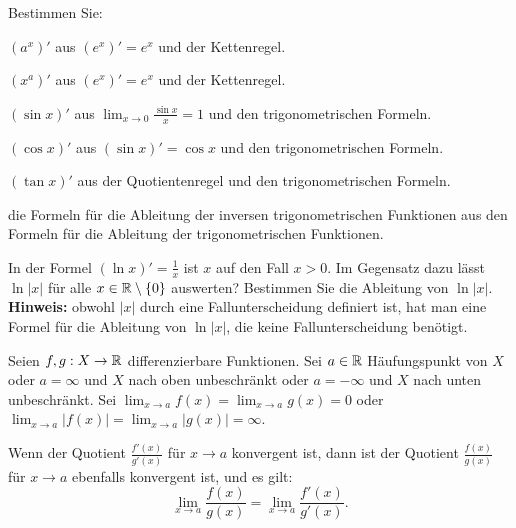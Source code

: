 	\begin{aufg} 
		Bestimmen Sie: 
		\begin{enuma}
			\item $(a^x)'$ aus $(e^x)' = e^x$ und der Kettenregel. 
			\item $(x^a)'$ aus $(e^x)' = e^x$ und der Kettenregel. 
			\item $(\sin x)'$ aus $\lim_{x \to 0} \frac{\sin x}{x} = 1$ und den trigonometrischen Formeln. 
			\item $(\cos x)'$ aus $(\sin x)' = \cos x$ und den trigonometrischen Formeln. 
			\item $(\tan x)'$ aus der Quotientenregel und den trigonometrischen Formeln.
			\item die Formeln für die Ableitung der inversen trigonometrischen Funktionen aus den Formeln für die Ableitung der trigonometrischen Funktionen. 
		\end{enuma} 
	\end{aufg} 

\begin{aufg} 
	In der Formel $(\ln x)' =\frac{1}{x}$ ist $x$ auf den Fall $x>0$. Im Gegensatz dazu lässt $\ln |x|$ für alle $x \in \mathbb{R} \setminus \{0\}$ auswerten? Bestimmen Sie die Ableitung von $\ln |x|$. 
	 \textbf{Hinweis:} obwohl $|x|$ durch eine Fallunterscheidung definiert ist, hat man eine Formel für die Ableitung von $\ln |x|$, die keine Fallunterscheidung benötigt. 
\end{aufg} 

\begin{thm}
	Seien $f, g : X \to \mathbb{R}$ differenzierbare Funktionen. Sei $a \in \mathbb{R}$ Häufungspunkt von $X$ oder $a=\infty$ und $X$ nach oben unbeschränkt oder $a = -\infty$ und $X$ nach unten unbeschränkt. Sei $\lim_{x \to a} f(x) = \lim_{x \to a} g(x) = 0$ oder $\lim_{x \to a} |f(x)| = \lim_{x \to a} |g(x)| = \infty$. 
	
	Wenn der Quotient $\frac{f'(x)}{g'(x)}$ für $x \to a$ konvergent ist, dann ist der Quotient $\frac{f(x)}{g(x)}$ für $x \to a$ ebenfalls konvergent ist, und es gilt: 
	\[
		\lim_{x \to a} \frac{f(x)}{g(x)} = \lim_{x \to a} \frac{f'(x)}{g'(x)}. 
	\]  
\end{thm} 



